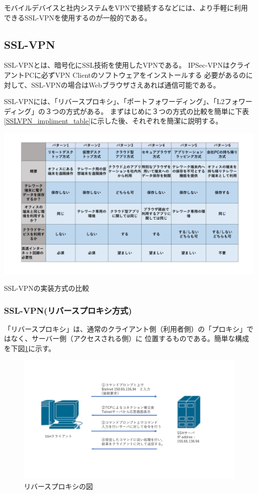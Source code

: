 \documentclass[12pt,a4paper,titlepage]{jreport}
\begin{document}
モバイルデバイスと社内システムをVPNで接続するなどには、より手軽に利用できるSSL-VPNを使用するのが一般的である。


\subsection{SSL-VPN}
SSL-VPNとは、暗号化にSSL技術を使用したVPNである。
IPSec-VPNはクライアントPCに必ずVPN Clientのソフトウェアをインストールする
必要があるのに対して、SSL-VPNの場合はWebブラウザさえあれば通信可能である。

SSL-VPNには、「リバースプロキシ」、「ポートフォワーディング」、「L2フォワーディング」の３つの方式がある。
まずはじめに３つの方式の比較を簡単に下表\ref{SSLVPN_impliment_table}に示した後、それぞれを簡潔に説明する。

\begin{table}[h]
    \centering
    \includegraphics[width=1.0\textwidth, page=3]{graphs/telework_list.pdf}
    \caption{SSL-VPNの実装方式の比較}
    \label{SSLVPN_impliment_table}
\end{table}

\subsubsection*{SSL-VPN(リバースプロキシ方式)}

「リバースプロキシ」は、通常のクライアント側（利用者側）の「プロキシ」ではなく、サーバー側（アクセスされる側）に
位置するものである。簡単な構成を下図\ref{reverse_proxy}に示す。

\begin{figure}[h]
    \centering
    \includegraphics[width=1.0\textwidth, page=16]{graphs/network_archtecture.pdf}
    \caption{リバースプロキシの図}
    \label{reverse_proxy}
\end{figure}
\end{document}
